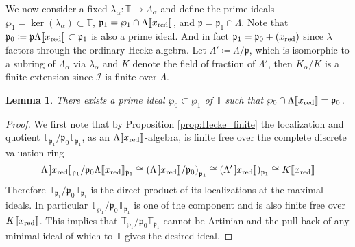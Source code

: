 \documentclass[leqno]{amsart}
\newtheorem{lem}[thm]{Lemma}
\theoremstyle{definition}
\theoremstyle{remark}
\newcommand{\fp}{\mathfrak{p}}
\newcommand{\xx}{x_\textnormal{red}}
\newcommand{\TT}{\mathbb{T}} %
\newcommand{\I}{\mathcal{I}} %
\begin{document}
We now consider a fixed 
$\lambda_\alpha\colon \TT\to \Lambda_\alpha$
and define the prime ideals 
$\wp_1=\ker(\lambda_\alpha)\subset \TT$,
$\fp_1=\wp_1\cap \Lambda\llbracket\xx\rrbracket$, and
$\fp=\fp_1\cap \Lambda$.
Note that $\fp_0\coloneqq \fp\Lambda\llbracket\xx\rrbracket\subset \fp_1$
is also a prime ideal.
And in fact $\fp_1=\fp_0+(\xx)$
since $\lambda$ factors through the ordinary Hecke algebra.
Let $\Lambda'\coloneqq \Lambda/\fp$,
which is isomorphic to a subring of $\Lambda_\alpha$ via $\lambda_\alpha$
and $K$ denote the field of fraction of $\Lambda'$,
then $K_\alpha/K$ is a finite extension 
since $\I$ is finite over $\Lambda$.


\begin{lem}
There exists a prime ideal 
$\wp_0\subset \wp_1$ of $\TT$ such that 
$\wp_0\cap \Lambda\llbracket \xx\rrbracket=\fp_0$.
\end{lem}
\begin{proof}

We first note that 
by Proposition \ref{prop:Hecke_finite}
the localization and quotient
$\TT_{\fp_1}/\fp_0\TT_{\fp_1}$,
as an $\Lambda\llbracket\xx\rrbracket$-algebra,
is finite free over
the complete discrete valuation ring
\[
\Lambda\llbracket\xx\rrbracket_{\fp_1}/
\fp_0\Lambda\llbracket\xx\rrbracket_{\fp_1}\cong
\left(
\Lambda\llbracket\xx\rrbracket/\fp_0
\right)_{\fp_1}\cong
(\Lambda'\llbracket\xx\rrbracket)_{\fp_1}\cong 
K\llbracket\xx\rrbracket
\]
Therefore $\TT_{\fp_1}/\fp_0\TT_{\fp_1}$
is the direct product of its localizations at the maximal ideals.
In particular $\TT_{\wp_1}/\fp_0\TT_{\fp_1}$
is one of the component and is also finite free over 
$K\llbracket\xx\rrbracket$.
This implies that $\TT_{\wp_1}/\fp_0\TT_{\fp_1}$ cannot be Artinian
and the pull-back of any minimal ideal of which to $\TT$
gives the desired ideal.

\end{proof}
\end{document}
